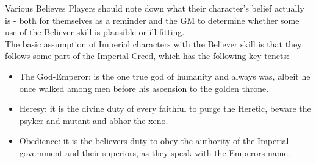 \begin{DndSidebar}{Various Believes}
Players should note down what their character's belief actually is - both for themselves as a reminder and the GM to determine whether some use of the Believer skill is plausible or ill fitting.\\
The basic assumption of Imperial characters with the Believer skill is that they follows some part of the Imperial Creed, which has the following key tenets:
\begin{itemize}
	\item The God-Emperor: is the one true god of humanity and always was, albeit he once walked among men before his ascension to the golden throne.
	\item Heresy: it is the divine duty of every faithful to purge the Heretic, beware the psyker and mutant and abhor the xeno.
	\item Obedience: it is the believers duty to obey the authority of the Imperial government and their superiors, as they speak with the Emperors name.
\end{itemize}
\end{DndSidebar}

